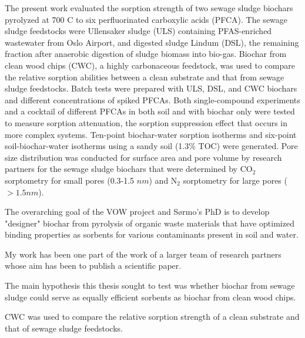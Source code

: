 The present work evaluated the sorption strength of two sewage sludge biochars pyrolyzed at 700 \textdegree C to six perfluorinated carboxylic acids (PFCA). The sewage sludge feedstocks were Ullensaker sludge (ULS) containing PFAS-enriched wastewater from Oslo Airport, and digested sludge Lindum (DSL), the remaining fraction after anaerobic digestion of sludge biomass into bio-gas. Biochar from clean wood chips (CWC), a highly carbonaceous feedstock, was used to compare the relative sorption abilities between a clean substrate and that from sewage sludge feedstocks. Batch tests were prepared with ULS, DSL, and CWC biochars and different concentrations of spiked PFCAs. Both single-compound experiments and a cocktail of different PFCAs in both soil and with biochar only were tested to measure sorption attenuation, the sorption suppression effect that occurs in more complex systems. Ten-point biochar-water sorption isotherms and six-point soil-biochar-water isotherms using a sandy soil (1.3\% TOC) were generated. Pore size distribution was conducted for surface area and pore volume by research partners for the sewage sludge biochars that were determined by $\mathrm{CO_2}$ sorptometry for small pores (0.3-1.5 $nm$) and $\mathrm{N_2}$ sorptometry for large pores ($>1.5 nm$).

The overarching goal of the VOW project and S\o rmo's PhD is to develop "designer" biochar from pyrolysis of organic waste materials that have optimized binding properties as sorbents for various contaminants present in soil and water.

My work has been one part of the work of a larger team of research partners whose aim has been to publish a scientific paper.

The main hypothesis this thesis sought to test was whether biochar from sewage sludge could serve as equally efficient sorbents as biochar from clean wood chips. 

CWC was used to compare the relative sorption strength of a clean substrate and that of sewage sludge feedstocks. 

